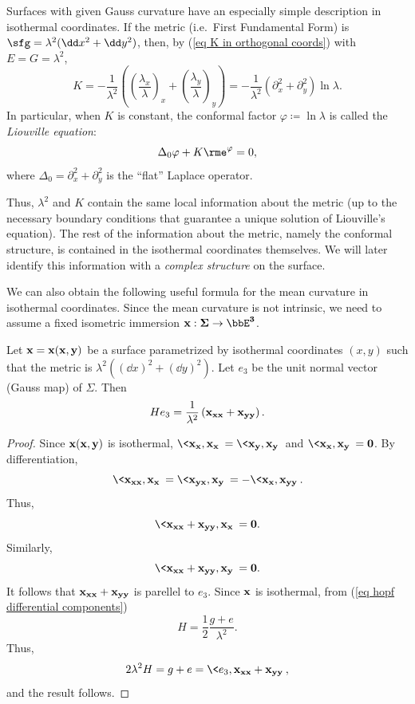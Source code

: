 \begin{example}
    Surfaces with given Gauss curvature have an especially simple description in isothermal coordinates. If the metric (i.e.\ First Fundamental Form) is $\sfg=\lambda^2(\dd x^2+\dd y^2)$, then, by (\ref{eq K in orthogonal coords}) with $E=G=\lambda^2$,
    \[K=-\frac{1}{\lambda^2}\left(\left(\frac{\lambda_x}{\lambda}\right)_x+\left(\frac{\lambda_y}{\lambda}\right)_y \right)=-\frac{1}{\lambda^2}(\partial_x^2+\partial_y^2)\ln\lambda.\label{eq K in isothermal coords}\]
    In particular, when $K$ is constant, the conformal factor $\varphi\coloneqq \ln\lambda$ is called the \emph{Liouville equation}:
    \[\Delta_0 \varphi+K\rme^{\varphi}=0,\label{eq liouville general}\]
    where $\Delta_0=\partial_x^2+\partial_y^2$ is the ``flat'' Laplace operator.
\end{example}

Thus, $\lambda^2$ and $K$ contain the same local information about the metric (up to the necessary boundary conditions that guarantee a unique solution of Liouville's equation). The rest of the information about the metric, namely the conformal structure, is contained in the isothermal coordinates themselves. We will later identify this information with a \emph{complex structure} on the surface.

We can also obtain the following useful formula for the mean curvature in isothermal coordinates. Since the mean curvature is not intrinsic, we need to assume a fixed isometric immersion $\bf{x}:\Sigma\to \bbE^3$.
\begin{prop}\label{prop mean curvature laplace}
    Let $\bf{x}=\bf{x}(x,y)$ be a surface parametrized by isothermal coordinates $(x,y)$ such that the metric is $\lambda^2((\dd x)^2+(\dd y)^2)$. Let $e_3$ be the unit normal vector (Gauss map) of $\Sigma$. Then 
    \[H e_3=\frac{1}{\lambda^2}\left(\bf{x}_{xx}+\bf{x}_{yy}\right).\]
\end{prop}
\begin{proof}
    Since $\bf{x}(x,y)$ is isothermal, $\<\bf{x}_x,\bf{x}_x\>=\<\bf{x}_y,\bf{x}_y\>$ and $\<\bf{x}_x,\bf{x}_y\>=0$. By differentiation, 
    \[\<\bf{x}_{xx},\bf{x}_x\>=\<\bf{x}_{yx},\bf{x}_y\>=-\<\bf{x}_x,\bf{x}_{yy}\>.\]
    Thus, 
    \[\<\bf{x}_{xx}+\bf{x}_{yy},\bf{x}_x\>=0.\]
    Similarly, 
    \[\<\bf{x}_{xx}+\bf{x}_{yy},\bf{x}_y\>=0.\]
    It follows that $\bf{x}_{xx}+\bf{x}_{yy}$ is parellel to $e_3$. Since $\bf{x}$ is isothermal, from (\ref{eq hopf differential components})
    \[H=\frac{1}{2}\frac{g+e}{\lambda^2}.\]
    Thus,
    \[2\lambda^2 H=g+e=\<e_3,\bf{x}_{xx}+\bf{x}_{yy}\>,\]
    and the result follows.
\end{proof}


